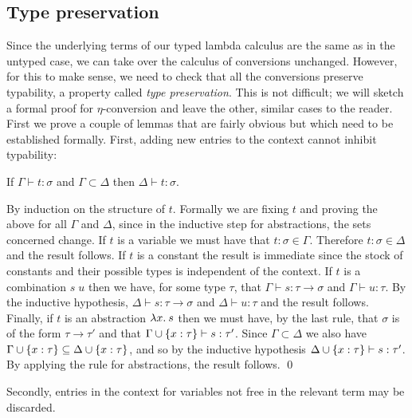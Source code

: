 \subsection{Type preservation}

Since the underlying terms of our typed lambda calculus are the same as in the
untyped case, we can take over the calculus of conversions unchanged. However,
for this to make sense, we need to check that all the conversions preserve
typability, a property called {\em type preservation}. This is not difficult;
we will sketch a formal proof for $\eta$-conversion and leave the other,
similar cases to the reader. First we prove a couple of lemmas that are fairly
obvious but which need to be established formally. First, adding new entries to
the context cannot inhibit typability:

\begin{lemma}

If $\Gamma \vdash t : \sigma$ and $\Gamma \subset \Delta$ then $\Delta \vdash t
: \sigma$.

\proof By induction on the structure of $t$. Formally we are fixing $t$ and
proving the above for all $\Gamma$ and $\Delta$, since in the inductive step
for abstractions, the sets concerned change. If $t$ is a variable
we must have that $t:\sigma \in \Gamma$. Therefore $t:\sigma \in \Delta$ and
the result follows. If $t$ is a constant the result is immediate since the
stock of constants and their possible types is independent of the context. If
$t$ is a combination $s\; u$ then we have, for some type $\tau$, that $\Gamma
\vdash s : \tau \to \sigma$ and $\Gamma \vdash u : \tau$. By the inductive
hypothesis, $\Delta \vdash s : \tau \to \sigma$ and $\Delta \vdash u : \tau$
and the result follows. Finally, if $t$ is an abstraction $\lambda x.\: s$ then we
must have, by the last rule, that $\sigma$ is of the form $\tau \to \tau'$ and
that $\Gamma \cup \{x:\tau\} \vdash s : \tau'$. Since $\Gamma \subset \Delta$
we also have $\Gamma \cup \{x:\tau\} \subseteq \Delta \cup \{x:\tau\}$, and
so by the inductive hypothesis $\Delta \cup \{x:\tau\} \vdash s : \tau'$. By
applying the rule for abstractions, the result follows. \qed

\end{lemma}

Secondly, entries in the context for variables not free in the relevant term
may be discarded.

